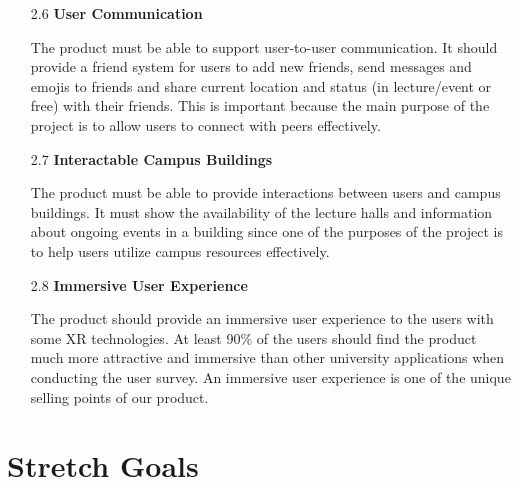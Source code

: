 \documentclass{article}
\begin{document}
\begin{itemize}
\item[2.6] \textbf{User Communication}

The product must be able to support user-to-user communication. It should provide a friend system for users to add new friends, send messages and emojis to friends and share current location and status (in lecture/event or free) with their friends. This is important because the main purpose of the project is to allow users to connect with peers effectively.

\item[2.7] \textbf{Interactable Campus Buildings}

The product must be able to provide interactions between users and campus buildings. It must show the availability of the lecture halls and information about ongoing events in a building since one of the purposes of the project is to help users utilize campus resources effectively.

\item[2.8] \textbf{Immersive User Experience}

The product should provide an immersive user experience to the users with some XR technologies. At least 90\% of the users should find the product much more attractive and immersive than other university applications when conducting the user survey. An immersive user experience is one of the unique selling points of our product.

\end{itemize}

\section{Stretch Goals}
\end{document}
